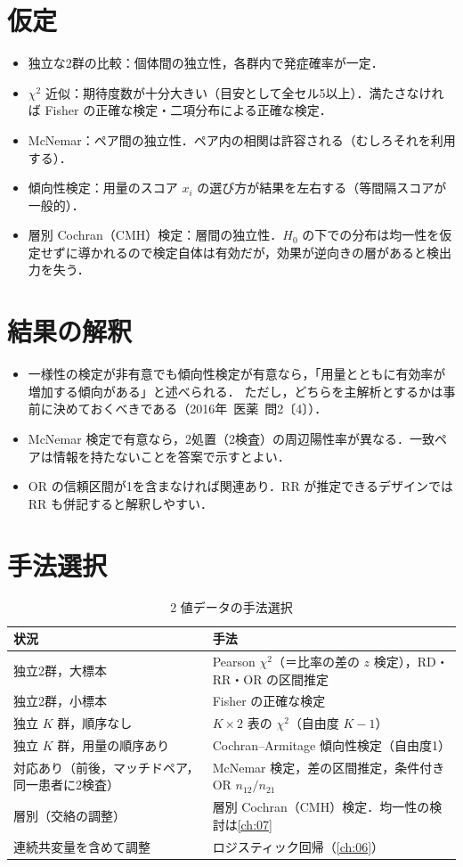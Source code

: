 \documentclass[a4paper,11pt,openany]{ltjsbook}
\newcommand{\kakomon}[2]{\mbox{#1年 医薬 問#2}}
\begin{document}
\section{仮定}\label{sec:04-assump}
\begin{itemize}
\item 独立な2群の比較：個体間の独立性，各群内で発症確率が一定．
\item $\chi^2$ 近似：期待度数が十分大きい（目安として全セル5以上）．満たさなければ Fisher の正確な検定・二項分布による正確な検定．
\item McNemar：ペア間の独立性．ペア内の相関は許容される（むしろそれを利用する）．
\item 傾向性検定：用量のスコア $x_i$ の選び方が結果を左右する（等間隔スコアが一般的）．
\item 層別 Cochran（CMH）検定：層間の独立性．$H_0$ の下での分布は均一性を仮定せずに導かれるので検定自体は有効だが，効果が逆向きの層があると検出力を失う．
\end{itemize}

\section{結果の解釈}\label{sec:04-interp}
\begin{itemize}
\item 一様性の検定が非有意でも傾向性検定が有意なら，「用量とともに有効率が増加する傾向がある」と述べられる．
      ただし，どちらを主解析とするかは事前に決めておくべきである（\kakomon{2016}{2}〔4〕）．
\item McNemar 検定で有意なら，2処置（2検査）の周辺陽性率が異なる．一致ペアは情報を持たないことを答案で示すとよい．
\item OR の信頼区間が1を含まなければ関連あり．RR が推定できるデザインでは RR も併記すると解釈しやすい．
\end{itemize}

\section{手法選択}\label{sec:04-choice}
\begin{table}[htbp]
\centering\small
\caption{2 値データの手法選択}\label{tab:04-choice}
\begin{tabular}{@{}L{55mm}L{85mm}@{}}
\toprule
状況 & 手法\\
\midrule
独立2群，大標本 & Pearson $\chi^2$（＝比率の差の $z$ 検定），RD・RR・OR の区間推定\\
独立2群，小標本 & Fisher の正確な検定\\
独立 $K$ 群，順序なし & $K\times2$ 表の $\chi^2$（自由度 $K-1$）\\
独立 $K$ 群，用量の順序あり & Cochran--Armitage 傾向性検定（自由度1）\\
対応あり（前後，マッチドペア，同一患者に2検査） & McNemar 検定，差の区間推定，条件付きOR $n_{12}/n_{21}$\\
層別（交絡の調整） & 層別 Cochran（CMH）検定．均一性の検討は\cref{ch:07}\\
連続共変量を含めて調整 & ロジスティック回帰（\cref{ch:06}）\\
\bottomrule
\end{tabular}
\end{table}
\end{document}
